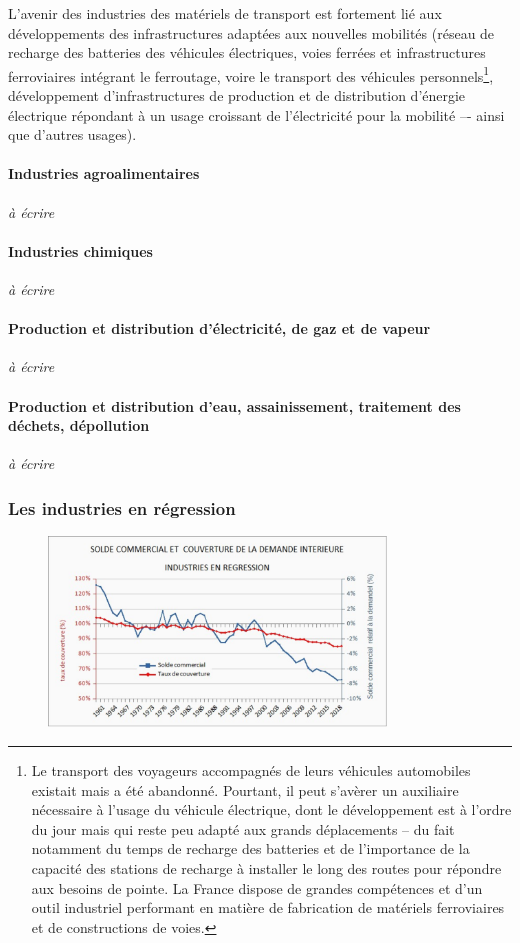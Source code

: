\documentclass[a4paper]{article}
\begin{document}
L’avenir des industries des matériels de transport est fortement lié aux développements des infrastructures adaptées aux nouvelles mobilités (réseau de recharge des batteries des véhicules électriques, voies ferrées et infrastructures ferroviaires intégrant le ferroutage, voire le transport des véhicules personnels\footnote{Le transport des voyageurs accompagnés de leurs véhicules automobiles existait mais a été abandonné. Pourtant, il peut s’avèrer un auxiliaire nécessaire à l’usage du véhicule électrique, dont le développement est à l’ordre du jour mais qui reste peu adapté aux grands déplacements – du fait notamment du temps de recharge des batteries et de l’importance de la capacité des stations de recharge à installer le long des routes pour répondre aux besoins de pointe. La France dispose de grandes compétences et d’un outil industriel performant en matière de fabrication de matériels ferroviaires et de constructions de voies.}, développement d’infrastructures de production et de distribution d’énergie électrique répondant à un usage croissant de l’électricité pour la mobilité –- ainsi que d’autres usages).

\paragraph{Industries agroalimentaires}
\textit{à écrire}

\paragraph{Industries chimiques}
\textit{à écrire}

\paragraph{Production et distribution d’électricité, de gaz et de vapeur}
\textit{à écrire}

\paragraph{Production et distribution d’eau, assainissement, traitement des déchets, dépollution}
\textit{à écrire}

\subsubsection{Les industries en régression}

\begin{figure}[H]
    \centering
    \includegraphics*[width=0.8\textwidth]{images/solde3}
    \label{fig:solde3}
\end{figure}
\end{document}
